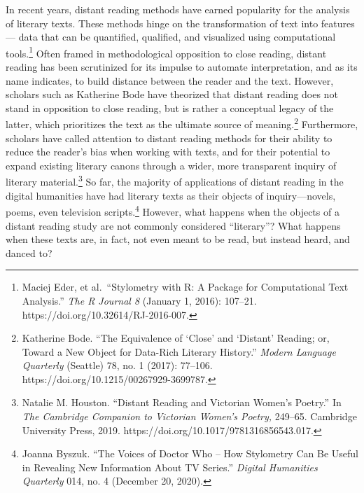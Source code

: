 \documentclass[
  letterpaper,
  DIV=11,
  numbers=noendperiod]{scrartcl}
\begin{document}
In recent years, distant reading methods have earned popularity for the
analysis of literary texts. These methods hinge on the transformation of
text into features--- data that can be quantified, qualified, and
visualized using computational tools.\footnote{Maciej Eder, et
  al.~``Stylometry with R: A Package for Computational Text Analysis.''
  \emph{The R Journal 8} (January 1, 2016): 107--21.
  https://doi.org/10.32614/RJ-2016-007.} Often framed in methodological
opposition to close reading, distant reading has been scrutinized for
its impulse to automate interpretation, and as its name indicates, to
build distance between the reader and the text. However, scholars such
as Katherine Bode have theorized that distant reading does not stand in
opposition to close reading, but is rather a conceptual legacy of the
latter, which prioritizes the text as the ultimate source of
meaning.\footnote{Katherine Bode. ``The Equivalence of `Close' and
  `Distant' Reading; or, Toward a New Object for Data-Rich Literary
  History.'' \emph{Modern Language Quarterly} (Seattle) 78, no. 1
  (2017): 77--106. https://doi.org/10.1215/00267929-3699787.}
Furthermore, scholars have called attention to distant reading methods
for their ability to reduce the reader's bias when working with texts,
and for their potential to expand existing literary canons through a
wider, more transparent inquiry of literary material.\footnote{Natalie
  M. Houston. ``Distant Reading and Victorian Women's Poetry.'' In
  \emph{The Cambridge Companion to Victorian Women's Poetry,} 249--65.
  Cambridge University Press, 2019.
  https://doi.org/10.1017/9781316856543.017.} So far, the majority of
applications of distant reading in the digital humanities have had
literary texts as their objects of inquiry---novels, poems, even
television scripts.\footnote{Joanna Byszuk. ``The Voices of Doctor Who
  -- How Stylometry Can Be Useful in Revealing New Information About TV
  Series.'' \emph{Digital Humanities Quarterly} 014, no. 4 (December 20,
  2020).} However, what happens when the objects of a distant reading
study are not commonly considered ``literary''? What happens when these
texts are, in fact, not even meant to be read, but instead heard, and
danced to?
\end{document}
